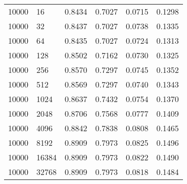 \begin{table}[H]
\begin{tabularx}{\textwidth}{
        |X
        |X
        |X
        |X
        |X
        |X|
    }
    10000 & 16 & 0.8434 & 0.7027 & 0.0715 & 0.1298 \\
    10000 & 32 & 0.8437 & 0.7027 & 0.0738 & 0.1335 \\
    10000 & 64 & 0.8435 & 0.7027 & 0.0724 & 0.1313 \\
    10000 & 128 & 0.8502 & 0.7162 & 0.0730 & 0.1325 \\
    10000 & 256 & 0.8570 & 0.7297 & 0.0745 & 0.1352 \\
    10000 & 512 & 0.8569 & 0.7297 & 0.0740 & 0.1343 \\
    10000 & 1024 & 0.8637 & 0.7432 & 0.0754 & 0.1370 \\
    10000 & 2048 & 0.8706 & 0.7568 & 0.0777 & 0.1409 \\
    10000 & 4096 & 0.8842 & 0.7838 & 0.0808 & 0.1465 \\
    10000 & 8192 & 0.8909 & 0.7973 & 0.0825 & 0.1496 \\
    10000 & 16384 & 0.8909 & 0.7973 & 0.0822 & 0.1490 \\
    10000 & 32768 & 0.8909 & 0.7973 & 0.0818 & 0.1484 \\ \hline
    \end{tabularx}
\end{table}



